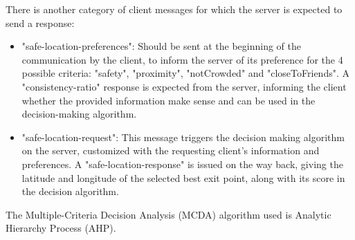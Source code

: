 There is another category of client messages for which the server is expected
to send a response:

\begin{itemize}
  \item "safe-location-preferences": Should be sent at the beginning of the
        communication by the client, to inform the server of its preference
        for the 4 possible criteria: "safety", "proximity", "notCrowded" and
        "closeToFriends". A "consistency-ratio" response is expected from the
        server, informing the client whether the provided information make
        sense and can be used in the decision-making algorithm.
  \item "safe-location-request": This message triggers the decision making
        algorithm on the server, customized with the requesting client's
        information and preferences. A "safe-location-response" is issued on
        the way back, giving the latitude and longitude of the selected best
        exit point, along with its score in the decision algorithm.
\end{itemize}

The Multiple-Criteria Decision Analysis (MCDA) algorithm used is Analytic
Hierarchy Process (AHP).

